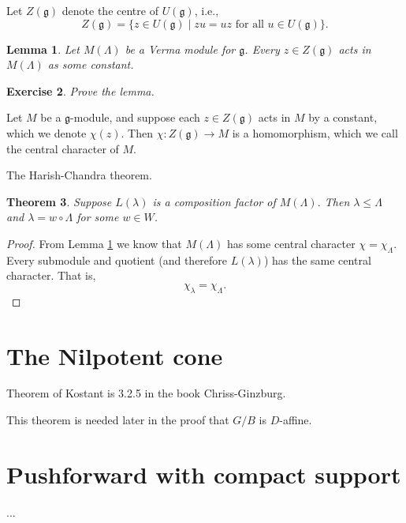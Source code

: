 \documentclass[12pt]{article}
\theoremstyle{plain}
\newtheorem{thm}{Theorem}[section]
\newtheorem{lemma}[thm]{Lemma}
\newtheorem{exer}[thm]{Exercise}
\theoremstyle{definition}
\numberwithin{equation}{section}
\newcommand{\la}{\lambda}
\newcommand{\La}{\Lambda}
\newcommand{\g}{\mathfrak{g}}
\newcommand{\h}{\mathfrak{h}}
\begin{document}
Let $Z(\g)$ denote the centre of $U(\g)$, i.e.,
\[
Z(\g) = \{z \in U(\g) \mid \text{$zu = uz$ for all $u \in U(\g)$}\}.
\]
\begin{lemma}\label{lem:verma.has.char}
Let $M(\La)$ be a Verma module for $\g$. Every $z \in Z(\g)$ acts in $M(\La)$ as some constant.
\end{lemma}

\begin{exer}
Prove the lemma.
\end{exer}


Let $M$ be a $\g$-module, and suppose each $z \in Z(\g)$ acts in $M$ by a constant, which we denote $\chi(z)$. Then $\chi : Z(\g) \rightarrow M$ is a homomorphism, which we call the central character of $M$.





The Harish-Chandra theorem.
\begin{thm}
Suppose $L(\la)$ is a composition factor of $M(\La)$. Then $\la \leq \La$ and $\la = w \circ \La$ for some $w \in W$.
\end{thm}

\begin{proof}
From Lemma \ref{lem:verma.has.char} we know that $M(\La)$ has some central character $\chi = \chi_\La$. Every submodule and quotient (and therefore $L(\la)$) has the same central character. That is,
\[
\chi_\la = \chi_\La.
\]

\end{proof}



\section{The Nilpotent cone}


Theorem of Kostant is 3.2.5 in the book Chriss-Ginzburg.

This theorem is needed later in the proof that $G/B$ is $D$-affine.





\section{Pushforward with compact support}

...
\end{document}
